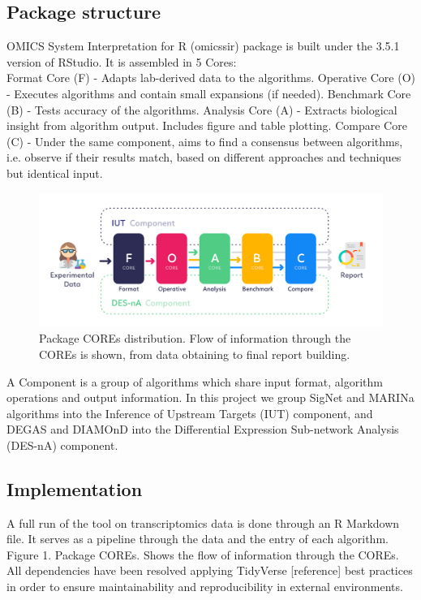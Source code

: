 \subsection{Package structure}
OMICS System Interpretation for R (omicssir) package is built under the 3.5.1 version of RStudio. It is assembled in 5 Cores:
\\

Format Core (F) - Adapts lab-derived data to the algorithms.
Operative Core (O) - Executes algorithms and contain small expansions (if needed).
Benchmark Core (B) - Tests accuracy of the algorithms.
Analysis Core (A) - Extracts biological insight from algorithm output. Includes figure and table plotting.
Compare Core (C) - Under the same component, aims to find a consensus between algorithms, i.e. observe if their results match, based on different approaches and techniques but identical input.
\\

\begin{figure}[!h]
    \centering
    \includegraphics[width=\linewidth]{Major Thesis/figures/art/workflow.png}
    \caption{Package COREs distribution. Flow of information through the COREs is shown, from data obtaining to final report building.}
    \label{fig:workflow}
\end{figure}

A Component is a group of algorithms which share input format, algorithm operations and output information. In this project we group SigNet and MARINa algorithms into the Inference of Upstream Targets (IUT) component, and DEGAS and DIAMOnD into the Differential Expression Sub-network Analysis (DES-nA) component.

\subsection{Implementation}
A full run of the tool on transcriptomics data is done through an R Markdown file. It serves as a pipeline through the data and the entry of each algorithm.
Figure 1. Package COREs. Shows the flow of information through the COREs.
All dependencies have been resolved applying TidyVerse [reference] best practices in order to ensure maintainability and reproducibility in external environments.


